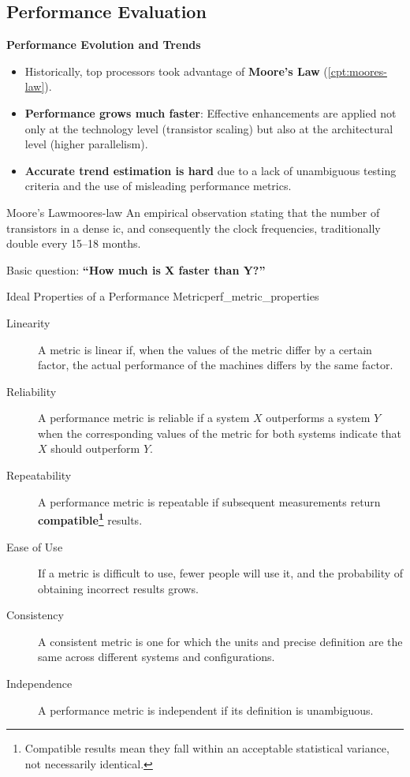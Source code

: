 \subsection{Performance Evaluation}
\textbf{Performance Evolution and Trends}
\begin{itemize}
    \item Historically, top processors took advantage of \textbf{Moore's Law} (\cref{cpt:moores-law}).
    \item \textbf{Performance grows much faster}: Effective enhancements are applied not only at the technology level (transistor scaling) but also at the architectural level (higher parallelism).
    \item \textbf{Accurate trend estimation is hard} due to a lack of unambiguous testing criteria and the use of misleading performance metrics.
\end{itemize}

\begin{concept}{Moore's Law}{moores-law}
    An empirical observation stating that the number of transistors in a dense \gls{ic}, and consequently the clock frequencies, traditionally double every 15--18 months.
\end{concept}

\noindent Basic question: \textbf{``How much is X faster than Y?''}
\begin{definition}{Ideal Properties of a Performance Metric}{perf_metric_properties}
\begin{description}
    \item[Linearity] A metric is linear if, when the values of the metric differ by a certain factor, the actual performance of the machines differs by the same factor.
    \item[Reliability] A performance metric is reliable if a system \(X\) outperforms a system \(Y\) when the corresponding values of the metric for both systems indicate that \(X\) should outperform \(Y\). 
    \item[Repeatability] A performance metric is repeatable if subsequent measurements return \textbf{compatible\footnote{Compatible results mean they fall within an acceptable statistical variance, not necessarily identical.}} results.
    \item[Ease of Use] If a metric is difficult to use, fewer people will use it, and the probability of obtaining incorrect results grows.
    \item[Consistency] A consistent metric is one for which the units and precise definition are the same across different systems and configurations.
    \item[Independence] A performance metric is independent if its definition is unambiguous.
\end{description}
\end{definition}

